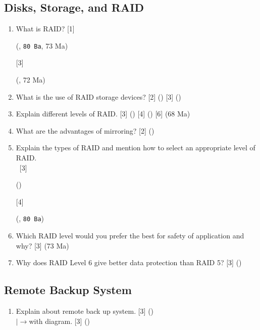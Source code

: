 \documentclass[12pt]{article}
\newcommand{\lb}{\\$\left|\rightarrow\right.$}
\newcommand{\enter}{\\\textcolor{white}{1}}
\begin{document}
    \subsection{Disks, Storage, and RAID}
    		\begin{enumerate}[noitemsep, topsep=0pt]
    			\item What is RAID? \hfill [1] \begin{footnotesize}(, \texttt{80 Ba}, 73 Ma)\end{footnotesize} [3] \begin{footnotesize}(, 72 Ma)\end{footnotesize}
    			
			    \item What is the use of RAID storage devices? \hfill [2] () [3] ()
    			
    			\item Explain different levels of RAID. \hfill [3] () [4] () [6] (68 Ma)
			
			    \item What are the advantages of mirroring? \hfill [2] ()
    			
    			\item Explain the types of RAID and mention how to select an appropriate level of RAID.
    			\enter\hfill [3] \begin{footnotesize}()\end{footnotesize} [4] \begin{footnotesize}(, \texttt{80 Ba})\end{footnotesize}
    			
    			\item Which RAID level would you prefer the best for safety of application and why? \hfill [3] (73 Ma)
    			
    			\item Why does RAID Level 6 give better data protection than RAID 5?  \hfill [3] ()
    		\end{enumerate}
    		
    \subsection{Remote Backup System}
		\begin{enumerate}[noitemsep, topsep=0pt]
			\item Explain about remote back up system. \hfill [3] ()
			\lb with diagram. \hfill [3] ()
		\end{enumerate}		    
    
\end{document}
